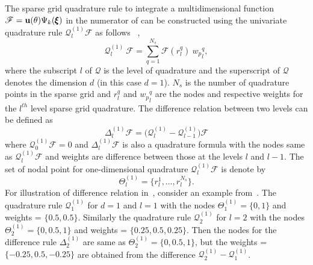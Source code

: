 \documentclass[letter,1p,11pt,oneside,onecolumn,sort&compress]{elsarticle}
\begin{document}
The sparse grid quadrature rule to integrate a multidimensional function $\mathscr{F} = {\mathrm{\bf{u}(\theta)}} {\Psi_k({\pmb{\xi}})}$ in the numerator of  %
can be constructed using the univariate quadrature rule ${\mathscr{Q}}_{l}^{(1)} \mathscr{F}$ as follows ~\cite{eldred2009recent,smith2013uncertainty},
\begin{equation}\label{eq:sg1D}
{\mathscr{Q}}_{l}^{(1)} \ {\mathscr{F}} =  \sum_{q=1}^{N_{s}} {\mathscr{F}}(r_{l}^{q})  \ {w_p}^{q}_{l},
\end{equation}
where the subscript $l$ of ${\mathscr{Q}}$ is the level of quadrature and the superscript of ${\mathscr{Q}}$ denotes the dimension $d$ (in this case $d=1$). $N_{s}$ is the number of quadrature points in the sparse grid and %
$r_{l}^{q}$ and ${{w_p}^{q}_{l}}$
are the nodes and respective weights for the $l^{th}$ level sparse grid quadrature. The difference relation between two levels can be defined as~\cite{smith2013uncertainty}
\begin{equation}\label{eq:sparseDifference}
  \Delta_l^{(1)} {\mathscr{F}} = \Big( {\mathscr{Q}}_{l}^{(1)} - {\mathscr{Q}}_{l-1}^{(1)}  \Big)  {\mathscr{F}}
\end{equation}
where ${\mathscr{Q}}_{0}^{(1)} {\mathscr{F}} = 0$ and $\Delta_l^{(1)}{\mathscr{F}}$ is also a quadrature formula with the nodes same as ${\mathscr{Q}}_{l}^{(1)} {\mathscr{F}}$ and weights are difference between those at the levels $l$ and $l-1$. The set of nodal point for one-dimensional quadrature ${\mathscr{Q}}_{l}^{(1)} \mathscr{F}$ is denote by
\begin{equation}
  \Theta_{l}^{(1)} = \{ r_{l}^{1},\dots,r_{l}^{N_s} \}.
\end{equation}
For illustration of difference relation in~, consider an example from~\cite{smith2013uncertainty}. The quadrature rule ${\mathscr{Q}}_{1}^{(1)}$ for $d=1$ and $l=1$ with the nodes $\Theta_{1}^{(1)}=\{ 0, 1 \}$ and weights = $\{ 0.5, 0.5 \}$. Similarly the quadrature rule ${\mathscr{Q}}_{2}^{(1)}$ for $l=2$ with the nodes $\Theta_{2}^{(1)}=\{ 0, 0.5, 1 \}$ and weights = $\{ 0.25, 0.5, 0.25 \}$. Then the nodes for the difference rule $\Delta_2^{(1)}$ are same as $\Theta_{2}^{(1)}= \{ 0, 0.5, 1 \}$, but the weights = $\{ -0.25, 0.5, -0.25 \}$ are obtained from the difference ${\mathscr{Q}}_{2}^{(1)} - {\mathscr{Q}}_{1}^{(1)}$.
\end{document}

